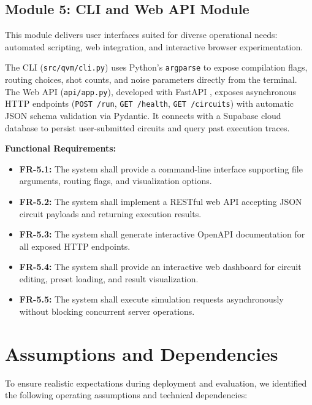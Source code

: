 \subsection{Module 5: CLI and Web API Module}

This module delivers user interfaces suited for diverse operational needs: automated scripting, web integration, and interactive browser experimentation.

The CLI (\texttt{src/qvm/cli.py}) uses Python's \texttt{argparse} to expose compilation flags, routing choices, shot counts, and noise parameters directly from the terminal. The Web API (\texttt{api/app.py}), developed with FastAPI \cite{fastapi2023}, exposes asynchronous HTTP endpoints (\texttt{POST /run}, \texttt{GET /health}, \texttt{GET /circuits}) with automatic JSON schema validation via Pydantic. It connects with a Supabase cloud database to persist user-submitted circuits and query past execution traces.

\textbf{Functional Requirements:}
\begin{itemize}[leftmargin=*]
    \item \textbf{FR-5.1:} The system shall provide a command-line interface supporting file arguments, routing flags, and visualization options.
    \item \textbf{FR-5.2:} The system shall implement a RESTful web API accepting JSON circuit payloads and returning execution results.
    \item \textbf{FR-5.3:} The system shall generate interactive OpenAPI documentation for all exposed HTTP endpoints.
    \item \textbf{FR-5.4:} The system shall provide an interactive web dashboard for circuit editing, preset loading, and result visualization.
    \item \textbf{FR-5.5:} The system shall execute simulation requests asynchronously without blocking concurrent server operations.
\end{itemize}


\section{Assumptions and Dependencies}

To ensure realistic expectations during deployment and evaluation, we identified the following operating assumptions and technical dependencies:

